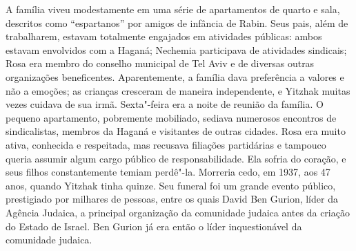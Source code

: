 A família viveu modestamente em uma série de apartamentos de quarto e
sala, descritos como ``espartanos'' por amigos de infância de Rabin.
Seus pais, além de trabalharem, estavam totalmente engajados em
atividades públicas: ambos estavam envolvidos com a Haganá; Nechemia
participava de atividades sindicais; Rosa era membro do conselho municipal de Tel
Aviv e de diversas outras organizações beneficentes. Aparentemente, a
família dava preferência a valores e não a emoções; as crianças
cresceram de maneira independente, e Yitzhak muitas vezes cuidava de sua
irmã. Sexta"-feira era a noite de reunião da família. O pequeno
apartamento, pobremente mobiliado, sediava numerosos encontros de
sindicalistas, membros da Haganá e visitantes de outras cidades. Rosa
era muito ativa, conhecida e respeitada, mas recusava filiações
partidárias e tampouco queria assumir algum cargo público de responsabilidade. Ela sofria
do coração, e seus filhos constantemente temiam perdê"-la. Morreria cedo,
em 1937, aos 47 anos, quando Yitzhak tinha quinze. Seu
funeral foi um grande evento público, prestigiado por milhares de
pessoas, entre os quais David Ben Gurion, líder da Agência Judaica, a
principal organização da comunidade judaica antes da criação do Estado
de Israel. Ben Gurion já era então o líder inquestionável da comunidade
judaica.

